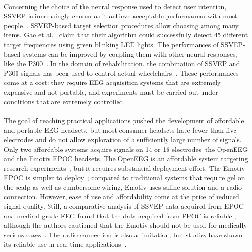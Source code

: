 \documentclass[smallextended]{svjour3}
\begin{document}
\\
Concerning the choice of the neural response used to detect user intention, SSVEP is increasingly chosen as it achieve acceptable performances with most people~\cite{Guger2012}. SSVEP-based target selection procedures allow choosing among many items. 
Gao et al.~\cite{SSVEPfiability} claim that their algorithm could successfully detect 45 different target frequencies using green blinking LED lights. The performances of SSVEP-based systems can be improved by coupling them with other neural responses, like the P300~\cite{yin2015hybrid}. In the domain of rehabilitation, the combination of SSVEP and P300 signals has been used to control actual wheelchairs~\cite{paper4}. These performances come at a cost: they require EEG acquisition systems that are extremely expensive and not portable, and experiments must be carried out under conditions that are extremely controlled.\\
\\
The goal of reaching practical applications pushed the development of affordable and portable EEG headsets, but most consumer headsets have fewer than five electrodes and do not allow exploration of a sufficiently large number of signals. Only two affordable systems acquire signals on 14 or 16 electrodes: the OpenEEG and the Emotiv EPOC headsets. The OpenEEG is an affordable system targeting research experiments~\cite{Salehuddin2011}, but it requires substantial deployment effort. The Emotiv EPOC is simpler to deploy~\cite{jian2014improving,van2012designing}; compared to traditional systems that require gel on the scalp as well as cumbersome wiring, Emotiv uses saline solution and a radio connection. However, ease of use and affordability come at the price of reduced signal quality. Still, a comparative analysis of SSVEP data acquired from EPOC and medical-grade EEG found that the data acquired from EPOC is reliable \cite{liu2012implementation}, although the authors cautioned that the Emotiv should not be used for medically serious cases~\cite{duvinage2013performance}. The radio connection is also a limitation, but studies have shown its reliable use in real-time applications~\cite{hvaring2014comparison}.\\
\\
\end{document}
